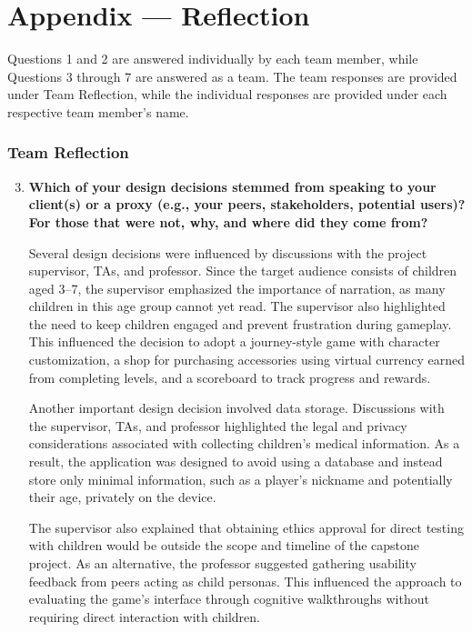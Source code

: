 \documentclass[10pt, titlepage]{article}
\begin{document}
\newpage{}

\section{Appendix --- Reflection}\label{sec:Reflection}

Questions 1 and 2 are answered individually by each team member, while
Questions 3 through 7 are answered as a team. The team responses are
provided under Team Reflection, while the individual responses are provided
under each respective team member's name.

\subsubsection*{Team Reflection}

\begin{enumerate}
    \setcounter{enumi}{2}

    \item \textbf{Which of your design decisions stemmed from speaking to your
    client(s) or a proxy (e.g., your peers, stakeholders, potential users)?
    For those that were not, why, and where did they come from?}

    Several design decisions were influenced by discussions
    with the project supervisor, TAs, and professor. Since the
    target audience consists of children aged 3--7, the
    supervisor emphasized the importance of narration, as
    many children in this age group cannot yet read. The
    supervisor also highlighted the need to keep children
    engaged and prevent frustration during gameplay. This
    influenced the decision to adopt a journey-style game
    with character customization, a shop for purchasing
    accessories using virtual currency earned from completing
    levels, and a scoreboard to track progress and rewards.

    Another important design decision involved data storage.
    Discussions with the supervisor, TAs, and professor
    highlighted the legal and privacy considerations associated
    with collecting children's medical information. As a
    result, the application was designed to avoid using a
    database and instead store only minimal information,
    such as a player's nickname and potentially their age,
    privately on the device.

    The supervisor also explained that obtaining ethics
    approval for direct testing with children would be
    outside the scope and timeline of the capstone project.
    As an alternative, the professor suggested gathering
    usability feedback from peers acting as child personas.
    This influenced the approach to evaluating the game's
    interface through cognitive walkthroughs without
    requiring direct interaction with children.


\end{enumerate}
\end{document}
